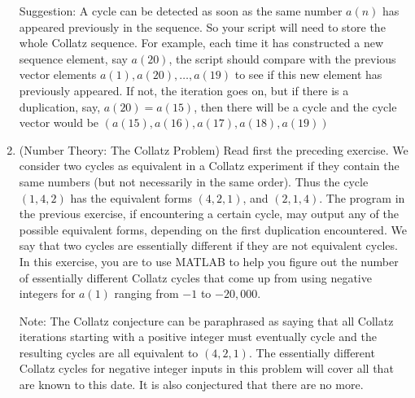 \documentclass[../main.tex]{subfiles}
\begin{document}
\begin{enumerate}
Suggestion: A cycle can be detected as soon as the same number $a(n)$ has appeared previously in the sequence. So your script will need to store the whole Collatz sequence. For example, each time it has constructed a new sequence element, say $a(20)$, the script should compare with the previous vector elements $a(1), a(20), \ldots, a(19)$ to see if this new element has previously appeared. If not, the iteration goes on, but if there is a duplication, say, $a(20)=a(15)$, then there will be a cycle and the cycle vector would be $(a(15), a(16), a(17), a(18), a(19))$

\item (Number Theory: The Collatz Problem) Read first the preceding exercise. We consider two cycles as equivalent in a Collatz experiment if they contain the same numbers (but not necessarily in the same order). Thus the cycle $(1,4,2)$ has the equivalent forms $(4,2,1)$, and $(2,1,4)$. The program in the previous exercise, if encountering a certain cycle, may output any of the possible equivalent forms, depending on the first duplication encountered. We say that two cycles are essentially different if they are not equivalent cycles. In this exercise, you are to use MATLAB to help you figure out the number of essentially different Collatz cycles that come up from using negative integers for $a(1)$ ranging from $-1$ to $-20,000$.

Note: The Collatz conjecture can be paraphrased as saying that all Collatz iterations starting with a positive integer must eventually cycle and the resulting cycles are all equivalent to $(4,2,1)$. The essentially different Collatz cycles for negative integer inputs in this problem will cover all that are known to this date. It is also conjectured that there are no more.
\end{enumerate}
\end{document}
